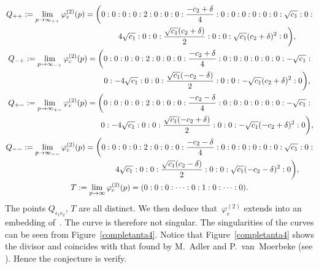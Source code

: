 \documentclass[pdftex]{sigma}
\numberwithin{equation}{section}
\begin{document}
\begin{gather*}
 Q_{++} :=\lim \limits_{p\rightarrow
 \infty_{++}}\varphi_c^{(2)}(p)
 = \biggl(0:0:0:0:2:0:0:0:\frac{-c_2+\delta}{4}:0:0:0:0:0:0: \sqrt{c_1}:0:\\ \hphantom{ Q_{++} :=\lim \limits_{p\rightarrow\infty_{++}}\varphi_c^{(2)}(p) =\biggl(}{}
 4\sqrt{c_1}:0:0:\frac{\sqrt{c_1}(c_2+\delta)}{2}:0:0:\sqrt{c_1}(c_2+\delta)^2:0\biggr),\\
 Q_{-+} :=\lim \limits_{p\rightarrow
 \infty_{-+}}\varphi_c^{(2)}(p)
 = \biggl(0:0:0:0:2:0:0:0:\frac{-c_2+\delta}{4}:0:0:0:0:0:0: -\sqrt{c_1}:\\ \hphantom{Q_{-+} :=\lim \limits_{p\rightarrow\infty_{-+}}\varphi_c^{(2)}(p) =\biggl(}{}
 0:-4\sqrt{c_1}:0:0:\frac{\sqrt{c_1}(-c_2-\delta)}{2}:0:0:-\sqrt{c_1}(c_2+\delta)^2:0\biggr),\\
 Q_{+-} :=\lim \limits_{p\rightarrow
 \infty_{+-}}\varphi_c^{(2)}(p)
 = \biggl(0:0:0:0:2:0:0:0:\frac{-c_2-\delta}{4}:0:0:0:0:0:0: -\sqrt{c_1}:\\ \hphantom{Q_{+-} :=\lim \limits_{p\rightarrow\infty_{+-}}\varphi_c^{(2)}(p)=\biggl(}{}
 0:-4\sqrt{c_1}:0:0:\frac{\sqrt{c_1}(-c_2+\delta)}{2}:0:0:-\sqrt{c_1}(-c_2+\delta)^2:0\biggr),\\
 Q_{--} :=\lim \limits_{p\rightarrow
 \infty_{--}}\varphi_c^{(2)}(p)
 = \biggl(0:0:0:0:2:0:0:0:\frac{-c_2-\delta}{4}:0:0:0:0:0:0: \sqrt{c_1}:0:\\ \hphantom{Q_{--} :=\lim \limits_{p\rightarrow\infty_{--}}\varphi_c^{(2)}(p)=\biggl(}{}
 4\sqrt{c_1}:0:0:\frac{\sqrt{c_1}(c_2-\delta)}{2}:0:0:\sqrt{c_1}(-c_2-\delta)^2:0\biggr),\\
 T :=\lim \limits_{p\rightarrow \infty}\varphi_c^{(2)}(p)=(0:0:0:\dots:0:1:0:\dots:0).
\end{gather*}
The points $Q_{\epsilon_1\epsilon_2}$, $T$ are all distinct. We
then deduce that~$\varphi_c^{(2)}$ extends into an
embedding of~. The curve
 is therefore not singular. The
singularities of the curves can be seen from Figure~\ref{completanta4}.
Notice that Figure~\ref{completanta4} shows the divisor and coincides with that
found by M.~Adler and P.~van~Moerbeke (see \cite[Table~2]{al_Moer4}). Hence the conjecture is verify.
\end{document}
